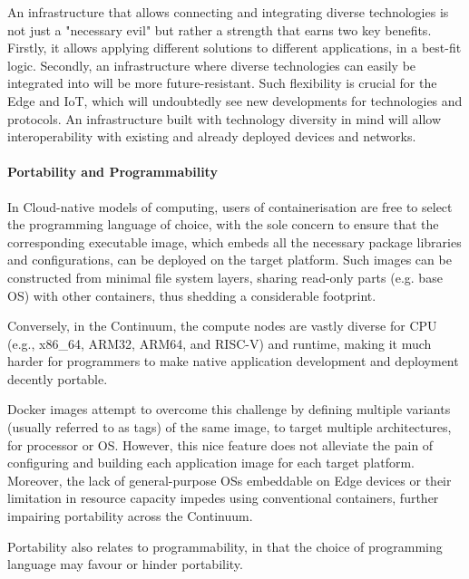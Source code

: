 An infrastructure that allows connecting and integrating diverse technologies is not just a "necessary evil" but rather a strength that earns two key benefits. Firstly, it allows applying different solutions to different applications, in a best-fit logic. 
Secondly, an infrastructure where diverse technologies can easily be integrated into will be more future-resistant. 
Such flexibility is crucial for the Edge and IoT, which will undoubtedly see new developments for technologies and protocols. An infrastructure built with technology diversity in mind will allow interoperability with existing and already deployed devices and networks.

\paragraph{Portability and Programmability}
In Cloud-native models of computing, users of containerisation are free to select the programming language of choice, with the sole concern to ensure that the corresponding executable image, which embeds all the necessary package libraries and configurations, can be deployed on the target platform. 
Such images can be constructed from minimal file system layers, sharing read-only parts (e.g. base OS) with other containers, thus shedding a considerable footprint. 

Conversely, in the Continuum, the compute nodes are vastly diverse for CPU (e.g., x86\_64, ARM32, ARM64, and RISC-V) and runtime, making it much harder for programmers to make native application development and deployment decently portable. 

Docker images attempt to overcome this challenge by defining multiple variants (usually referred to as tags) of the same image, to target multiple architectures, for processor or OS. 
However, this nice feature does not alleviate the pain of configuring and building each application image for each target platform. Moreover, the lack of general-purpose OSs embeddable on Edge devices or their limitation in resource capacity impedes using conventional containers, further impairing portability across the Continuum.

Portability also relates to programmability, in that the choice of programming language may favour or hinder portability. 

